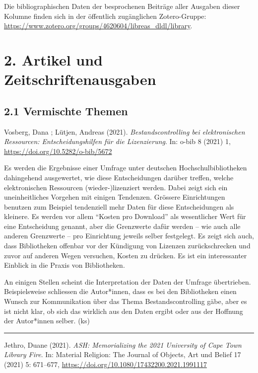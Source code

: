 \documentclass[a4paper,
fontsize=11pt,
oneside,
numbers=noperiodatend,
parskip=half-,
bibliography=totoc,
final
]{scrartcl}
\begin{document}
Die bibliographischen Daten der besprochenen Beiträge aller Ausgaben
dieser Kolumne finden sich in der öffentlich zugänglichen Zotero-Gruppe:
\url{https://www.zotero.org/groups/4620604/libreas_dldl/library}.

\hypertarget{artikel-und-zeitschriftenausgaben}{%
\section{2. Artikel und
Zeitschriftenausgaben}\label{artikel-und-zeitschriftenausgaben}}

\hypertarget{vermischte-themen}{%
\subsection{2.1 Vermischte Themen}\label{vermischte-themen}}

Vosberg, Dana ; Lütjen, Andreas (2021). \emph{Bestandscontrolling bei
elektronischen Ressourcen: Entscheidungshilfen für die Lizenzierung}.
In: o-bib 8 (2021) 1, \url{https://doi.org/10.5282/o-bib/5672}

Es werden die Ergebnisse einer Umfrage unter deutschen
Hochschulbibliotheken dahingehend ausgewertet, wie diese Entscheidungen
darüber treffen, welche elektronischen Ressourcen (wieder-)lizenziert
werden. Dabei zeigt sich ein uneinheitliches Vorgehen mit einigen
Tendenzen. Grössere Einrichtungen benutzen zum Beispiel tendenziell mehr
Daten für diese Entscheidungen als kleinere. Es werden vor allem
\enquote{Kosten pro Download} als wesentlicher Wert für eine
Entscheidung genannt, aber die Grenzwerte dafür werden -- wie auch alle
anderen Grenzwerte -- pro Einrichtung jeweils selber festgelegt. Es
zeigt sich auch, dass Bibliotheken offenbar vor der Kündigung von
Lizenzen zurückschrecken und zuvor auf anderen Wegen versuchen, Kosten
zu drücken. Es ist ein interessanter Einblick in die Praxis von
Bibliotheken.

An einigen Stellen scheint die Interpretation der Daten der Umfrage
übertrieben. Beispielsweise schliessen die Autor*innen, dass es bei den
Bibliotheken einen Wunsch zur Kommunikation über das Thema
Bestandscontrolling gäbe, aber es ist nicht klar, ob sich das wirklich
aus den Daten ergibt oder aus der Hoffnung der Autor*innen selber. (ks)

\begin{center}\rule{0.5\linewidth}{0.5pt}\end{center}

Jethro, Duane (2021). \emph{ASH: Memorializing the 2021 University of
Cape Town Library Fire}. In: Material Religion: The Journal of Objects,
Art und Belief 17 (2021) 5: 671--677,
\url{https://doi.org/10.1080/17432200.2021.1991117}
\end{document}
